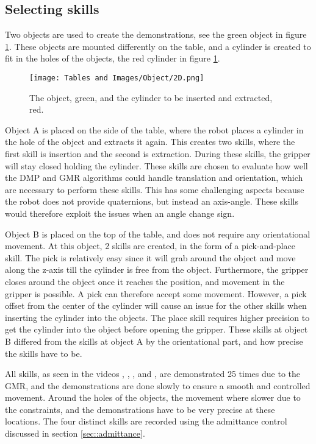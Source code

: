 \subsection{Selecting skills}\label{sec::skills} 
Two objects are used to create the demonstrations, see the green object in figure \ref{fig:skills:objects}. These objects are mounted differently on the table, and a cylinder is created to fit in the holes of the objects, the red cylinder in figure \ref{fig:skills:objects}.

\begin{figure}[!htb]
    \centering
    \texttt{[image: Tables and Images/Object/2D.png]}
    \caption{The object, green, and the cylinder to be inserted and extracted, red.}
    \label{fig:skills:objects}
\end{figure}

Object A is placed on the side of the table, where the robot places a cylinder in the hole of the object and extracts it again. 
This creates two skills, where the first skill is insertion and the second is extraction. During these skills, the gripper will stay closed holding the cylinder.
These skills are chosen to evaluate how well the DMP and GMR algorithms could handle translation and orientation, which are necessary to perform these skills. This has some challenging aspects because the robot does not provide quaternions, but instead an axis-angle. These skills would therefore exploit the issues when an angle change sign.

Object B is placed on the top of the table, and does not require any orientational movement. 
At this object, 2 skills are created, in the form of a pick-and-place skill. The pick is relatively easy since it will grab around the object and move along the z-axis till the cylinder is free from the object. Furthermore, the gripper closes around the object once it reaches the position, and movement in the gripper is possible. A pick can therefore accept some movement. However, a pick offset from the center of the cylinder will cause an issue for the other skills when inserting the cylinder into the objects. The place skill requires higher precision to get the cylinder into the object before opening the gripper.
These skills at object B differed from the skills at object A by the orientational part, and how precise the skills have to be.

All skills, as seen in the videos \cite{github-Skill-B_down}, \cite{github-Skill-A_down}, \cite{github-Skill-A_UP}, and \cite{github-Skill-B_UP}, are demonstrated 25 times due to the GMR, and the demonstrations are done slowly to ensure a smooth and controlled movement. Around the holes of the objects, the movement where slower due to the constraints, and the demonstrations have to be very precise at these locations. 
The four distinct skills are recorded using the admittance control discussed in section \ref{sec::admittance}.